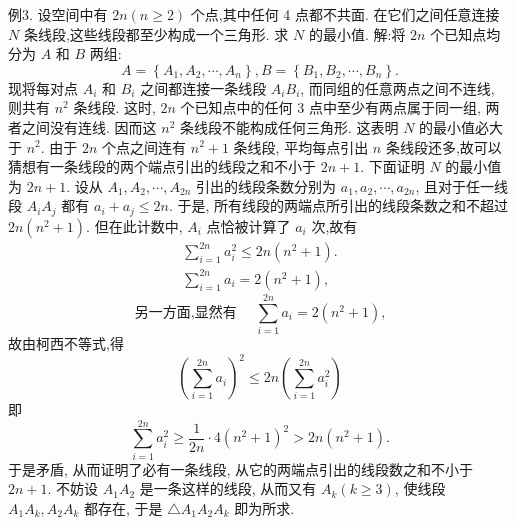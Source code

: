例3. 设空间中有 $2 n(n \geqslant 2)$ 个点,其中任何 4 点都不共面.
在它们之间任意连接 $N$ 条线段,这些线段都至少构成一个三角形.
求 $N$ 的最小值.
解:将 $2 n$ 个已知点均分为 $A$ 和 $B$ 两组:
$$
A=\left\{A_1, A_2, \cdots, A_n\right\}, B=\left\{B_1, B_2, \cdots, B_n\right\} .
$$
现将每对点 $A_i$ 和 $B_i$ 之间都连接一条线段 $A_i B_i$, 而同组的任意两点之间不连线, 则共有 $n^2$ 条线段.
这时, $2 n$ 个已知点中的任何 3 点中至少有两点属于同一组, 两者之间没有连线.
因而这 $n^2$ 条线段不能构成任何三角形.
这表明 $N$ 的最小值必大于 $n^2$. 由于 $2 n$ 个点之间连有 $n^2+1$ 条线段, 平均每点引出 $n$ 条线段还多,故可以猜想有一条线段的两个端点引出的线段之和不小于 $2 n+1$.
下面证明 $N$ 的最小值为 $2 n+1$.
设从 $A_1, A_2, \cdots, A_{2 n}$ 引出的线段条数分别为 $a_1, a_2, \cdots, a_{2 n}$, 且对于任一线段 $A_i A_j$ 都有 $a_i+a_j \leqslant 2 n$. 于是, 所有线段的两端点所引出的线段条数之和不超过 $2 n\left(n^2+1\right)$. 但在此计数中, $A_i$ 点恰被计算了 $a_i$ 次,故有
$$
\begin{gathered}
\sum_{i=1}^{2 n} a_i^2 \leqslant 2 n\left(n^2+1\right) . \\
\sum_{i=1}^{2 n} a_i=2\left(n^2+1\right),
\end{gathered}
$$
$$
\text { 另一方面,显然有 } \quad \sum_{i=1}^{2 n} a_i=2\left(n^2+1\right) \text {, }
$$
故由柯西不等式,得
$$
\left(\sum_{i=1}^{2 n} a_i\right)^2 \leqslant 2 n\left(\sum_{i=1}^{2 n} a_i^2\right)
$$
即
$$
\sum_{i=1}^{2 n} a_i^2 \geqslant \frac{1}{2 n} \cdot 4\left(n^2+1\right)^2>2 n\left(n^2+1\right) .
$$
于是矛盾, 从而证明了必有一条线段, 从它的两端点引出的线段数之和不小于 $2 n+1$. 不妨设 $A_1 A_2$ 是一条这样的线段, 从而又有 $A_k(k \geqslant 3)$, 使线段 $A_1 A_k, A_2 A_k$ 都存在, 于是 $\triangle A_1 A_2 A_k$ 即为所求.



